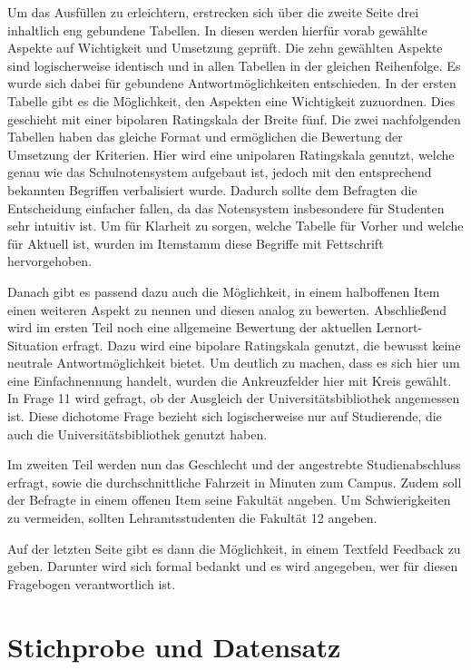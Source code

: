 \documentclass[11pt, a4paper]{article}
\begin{document}
Um das Ausfüllen zu erleichtern, erstrecken sich über die zweite Seite drei inhaltlich eng gebundene Tabellen. In diesen werden hierfür vorab gewählte Aspekte auf Wichtigkeit und Umsetzung geprüft. Die zehn gewählten Aspekte sind logischerweise identisch und in allen Tabellen in der gleichen Reihenfolge.
Es wurde sich dabei für gebundene Antwortmöglichkeiten entschieden.
In der ersten Tabelle gibt es die Möglichkeit, den Aspekten eine Wichtigkeit zuzuordnen. Dies geschieht mit einer bipolaren Ratingskala der Breite fünf.
Die zwei nachfolgenden Tabellen haben das gleiche Format und ermöglichen die Bewertung der Umsetzung der Kriterien. Hier wird eine unipolaren Ratingskala genutzt, welche genau wie das Schulnotensystem aufgebaut ist, jedoch 
mit den entsprechend bekannten Begriffen verbalisiert wurde.
Dadurch sollte dem Befragten die Entscheidung einfacher fallen, da das Notensystem insbesondere für Studenten sehr intuitiv ist.
Um für Klarheit zu sorgen, welche Tabelle für Vorher und welche für Aktuell ist, wurden im Itemstamm diese Begriffe mit Fettschrift hervorgehoben.

Danach gibt es passend dazu auch die Möglichkeit, in einem halboffenen Item einen weiteren Aspekt zu nennen und diesen analog zu bewerten.
Abschließend wird im ersten Teil noch eine allgemeine Bewertung der aktuellen Lernort-Situation erfragt.
Dazu wird eine bipolare Ratingskala genutzt, die bewusst keine neutrale Antwortmöglichkeit bietet.
Um deutlich zu machen, dass es sich hier um eine Einfachnennung handelt, wurden die Ankreuzfelder hier mit Kreis gewählt.
In Frage 11 wird gefragt, ob der Ausgleich der Universitätsbibliothek angemessen ist. Diese dichotome Frage bezieht sich logischerweise nur auf Studierende, die auch die Universitätsbibliothek genutzt haben. 

Im zweiten Teil werden nun das Geschlecht und der angestrebte Studienabschluss erfragt, sowie die durchschnittliche Fahrzeit in Minuten zum Campus.
Zudem soll der Befragte in einem offenen Item seine Fakultät angeben.
Um Schwierigkeiten zu vermeiden, sollten Lehramtsstudenten die Fakultät 12 angeben.

Auf der letzten Seite gibt es dann die Möglichkeit, in einem Textfeld Feedback zu geben.
Darunter wird sich formal bedankt und es wird angegeben, wer für diesen Fragebogen verantwortlich ist.
\newpage
\section{Stichprobe und Datensatz}
\label{Stichprobe und Datensatz}
\end{document}
